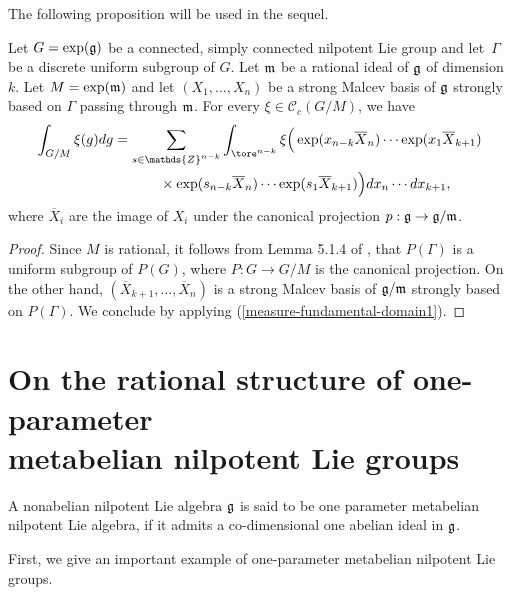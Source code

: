  The following
proposition will be used  in the sequel.

\begin{proposition}\label{decompositionmesure}
Let $G = \exp(\frak g)$ be a connected, simply connected nilpotent
Lie group and let~$\Gamma$ be a discrete uniform subgroup of $G$.
Let  $\frak m$ be a rational ideal of $\frak g$ of dimension $k$.
Let $M= \exp(\frak m)$ and let $(X_1, \ldots, X_n)$ be a strong
Malcev basis of $\frak g$ strongly based on $\Gamma$ passing through
$\frak m $.  For every $\xi\in \mathcal{C}_c(G/M)$, we have
\begin{gather*}%
\int_{G/M}  \xi(g)   dg   =
 \sum_{s\in \mathds{Z}^{n-k}}
\int_{\tore^{n-k}}  \xi\Big(\exp(x_{n-k} \overline{X}_n)\cdots
\exp(x_1 \overline{X}_{k+1})\\
\hphantom{\int_{G/M}  \xi(g)   dg   =}{}\times
\exp(s_{n-k} \overline{X}_n)\cdots
\exp(s_1 \overline{X}_{k+1})\Big)
   dx_n\cdots dx_{k+1},
   \end{gather*}
where $\overline{X}_i$ are the image of $X_i$ under the canonical
projection $p: \frak g\rightarrow \frak g/\frak m$.
\end{proposition}

 \begin{proof}
Since $M$ is rational, it follows  from  Lemma 5.1.4 of \cite{Cor1},
that $P(\Gamma)$ is a uniform subgroup of $P(G)$, where $P: G
\rightarrow G/M$ is the canonical projection. On the other hand,
$(\overline{X}_{k+1}, \ldots, \overline{X}_{n})$ is a strong Malcev
basis of $\frak g/\frak m$ strongly based on $P(\Gamma)$. We
conclude by applying (\ref{measure-fundamental-domain1}).
 \end{proof}



\section{On the rational structure  of
one-parameter\\ metabelian nilpotent Lie groups}\label{section4}


\begin{definition}
A nonabelian nilpotent Lie algebra  $\frak g$ is said to be one
parameter metabelian nilpotent Lie algebra, if it admits  a
co-dimensional one abelian ideal
 in $\frak g$. \end{definition}


First, we give an important example of one-parameter metabelian
nilpotent Lie groups.

